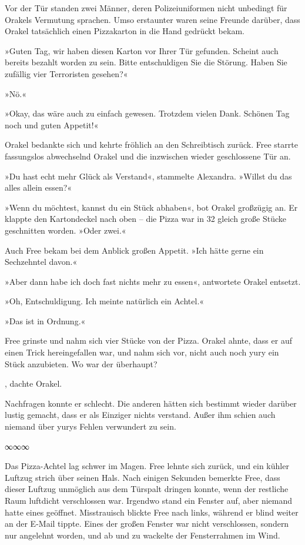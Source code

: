 Vor der Tür standen zwei Männer, deren Polizeiuniformen nicht unbedingt für Orakels Vermutung sprachen. Umso erstaunter waren seine Freunde darüber, dass Orakel tatsächlich einen Pizzakarton in die Hand gedrückt bekam.

»Guten Tag, wir haben diesen Karton vor Ihrer Tür gefunden. Scheint auch bereits bezahlt worden zu sein. Bitte entschuldigen Sie die Störung. Haben Sie zufällig vier Terroristen gesehen?«

»Nö.«

»Okay, das wäre auch zu einfach gewesen. Trotzdem vielen Dank. Schönen Tag noch und guten Appetit!«

Orakel bedankte sich und kehrte fröhlich an den Schreibtisch zurück. Free starrte fassungslos abwechselnd Orakel und die inzwischen wieder geschlossene Tür an.

»Du hast echt mehr Glück als Verstand«, stammelte Alexandra. »Willst du das alles allein essen?«

»Wenn du möchtest, kannst du ein Stück abhaben«, bot Orakel großzügig an. Er klappte den Kartondeckel nach oben – die Pizza war in 32 gleich große Stücke geschnitten worden. »Oder zwei.«

Auch Free bekam bei dem Anblick großen Appetit. »Ich hätte gerne ein Sechzehntel davon.«

»Aber dann habe ich doch fast nichts mehr zu essen«, antwortete Orakel entsetzt.

»Oh, Entschuldigung. Ich meinte natürlich ein Achtel.«

»Das ist in Ordnung.«

Free grinste und nahm sich vier Stücke von der Pizza. Orakel ahnte, dass er auf einen Trick hereingefallen war, und nahm sich vor, nicht auch noch yury ein Stück anzubieten. Wo war der überhaupt?

, dachte Orakel. 

Nachfragen konnte er schlecht. Die anderen hätten sich bestimmt wieder darüber lustig gemacht, dass er als Einziger nichts verstand. Außer ihm schien auch niemand über yurys Fehlen verwundert zu sein.

\begin{center}
	∞∞∞
\end{center}

Das Pizza-Achtel lag schwer im Magen. Free lehnte sich zurück, und ein kühler Luftzug strich über seinen Hals. Nach einigen Sekunden bemerkte Free, dass dieser Luftzug unmöglich aus dem Türspalt dringen konnte, wenn der restliche Raum luftdicht verschlossen war. Irgendwo stand ein Fenster auf, aber niemand hatte eines geöffnet. Misstrauisch blickte Free nach links, während er blind weiter an der E-Mail tippte. Eines der großen Fenster war nicht verschlossen, sondern nur angelehnt worden, und ab und zu wackelte der Fensterrahmen im Wind.

